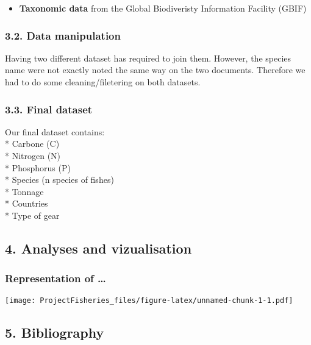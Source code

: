 \documentclass[
]{article}
\providecommand{\tightlist}{%
  \setlength{\itemsep}{0pt}\setlength{\parskip}{0pt}}
\begin{document}
\begin{itemize}
\tightlist
\item
  \textbf{Taxonomic data} from the Global Biodiveristy Information
  Facility (GBIF)
\end{itemize}

\hypertarget{data-manipulation}{%
\subsubsection{3.2. Data manipulation}\label{data-manipulation}}

Having two different dataset has required to join them. However, the
species name were not exactly noted the same way on the two documents.
Therefore we had to do some cleaning/filetering on both datasets.

\hypertarget{final-dataset}{%
\subsubsection{3.3. Final dataset}\label{final-dataset}}

Our final dataset contains:\\
* Carbone (C)\\
* Nitrogen (N)\\
* Phosphorus (P)\\
* Species (n species of fishes)\\
* Tonnage\\
* Countries\\
* Type of gear

\hypertarget{analyses-and-vizualisation}{%
\subsection{4. Analyses and
vizualisation}\label{analyses-and-vizualisation}}

\hypertarget{representation-of}{%
\subsubsection{Representation of \ldots{}}\label{representation-of}}

\texttt{[image: ProjectFisheries\_files/figure-latex/unnamed-chunk-1-1.pdf]}

\hypertarget{bibliography}{%
\subsection{5. Bibliography}\label{bibliography}}
\end{document}
